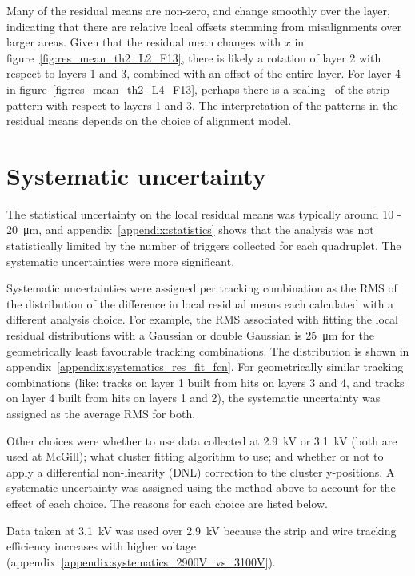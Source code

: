 Many of the residual means are non-zero, and change smoothly over the layer, indicating that there are relative local offsets stemming from misalignments over larger areas. Given that the residual mean changes with $x$ in figure~\ref{fig:res_mean_th2_L2_F13}, there is likely a rotation of layer 2 with respect to layers 1 and 3, combined with an offset of the entire layer. For layer 4 in figure~\ref{fig:res_mean_th2_L4_F13}, perhaps there is a scaling~\cite{carlson_results_2019} of the strip pattern with respect to layers 1 and 3. The interpretation of the patterns in the residual means depends on the choice of alignment model.

\section{Systematic uncertainty}
\label{sec:cosmics_sys_uncerts}

The statistical uncertainty on the local residual means was typically around \SI{10}{} - \SI{20}{\micro\meter}, and appendix~\ref{appendix:statistics} shows that the analysis was not statistically limited by the number of triggers collected for each quadruplet. The systematic uncertainties were more significant. 

Systematic uncertainties were assigned per tracking combination as the RMS of the distribution of the difference in local residual means each calculated with a different analysis choice. For example, the RMS associated with fitting the local residual distributions with a Gaussian or double Gaussian is \SI{25}{\micro\meter} for the geometrically least favourable tracking combinations. The distribution is shown in appendix~\ref{appendix:systematics_res_fit_fcn}. For geometrically similar tracking combinations (like: tracks on layer 1 built from hits on layers 3 and 4, and tracks on layer 4 built from hits on layers 1 and 2), the systematic uncertainty was assigned as the average RMS for both.

Other choices were whether to use data collected at 2.9~kV or 3.1~kV (both are used at McGill); what cluster fitting algorithm to use; and whether or not to apply a differential non-linearity (DNL) correction to the cluster y-positions. A systematic uncertainty was assigned using the method above to account for the effect of each choice. The reasons for each choice are listed below.

Data taken at 3.1~kV was used over 2.9~kV because the strip and wire tracking efficiency increases with higher voltage~\cite{lefebvre_thesis} (appendix~\ref{appendix:systematics_2900V_vs_3100V}).

